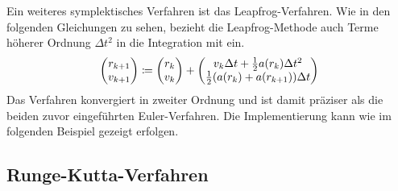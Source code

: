     Ein weiteres symplektisches Verfahren ist das Leapfrog-Verfahren.
    Wie in den folgenden Gleichungen zu sehen, bezieht die Leapfrog-Methode auch Terme höherer Ordnung $\Delta t^2$ in die Integration mit ein.
    \[
      \begin{pmatrix}
        r_{k+1} \\ v_{k+1}
      \end{pmatrix}
      \coloneqq
      \begin{pmatrix}
        r_k \\ v_k
      \end{pmatrix}
      +
      \begin{pmatrix}
        v_k\Delta t + \frac{1}{2}a(r_k)\Delta t^2 \\
        \frac{1}{2}(a(r_k) + a(r_{k+1}))\Delta t
      \end{pmatrix}
    \]
    Das Verfahren konvergiert in zweiter Ordnung und ist damit präziser als die beiden zuvor eingeführten Euler-Verfahren.
    Die Implementierung kann wie im folgenden Beispiel gezeigt erfolgen.
    \medskip
    \begin{tcolorbox}[colframe=black,colbacktitle=white,coltitle=black, attach boxed title to top center={yshift=-2mm},enhanced, titlerule=0.1pt, boxrule=0.5pt, arc=5pt,title=Quelltext:\quad Leapfrog-Integrator, breakable]
      
    \end{tcolorbox}



  \subsection{Runge-Kutta-Verfahren} %
  \label{sub:runge_kutta_verfahren}

